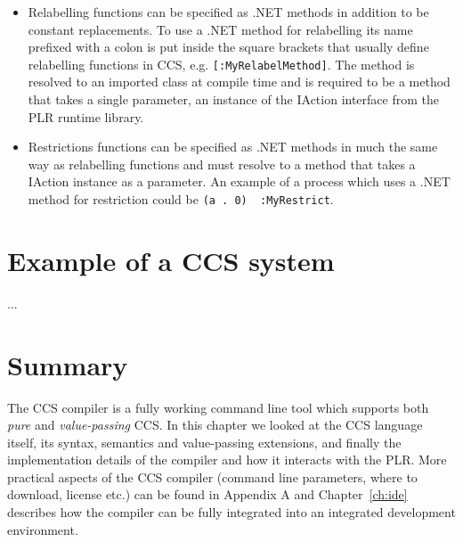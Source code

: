 \begin{itemize}
		\item Relabelling functions can be specified as .NET methods in addition 
		to be constant replacements. To use a .NET method for relabelling its name 
		prefixed with a colon is put inside the square brackets that usually 
		define relabelling functions in CCS, e.g. \texttt{[:MyRelabelMethod]}. The 
		method is resolved to an imported class at compile time and is required to 
		be a method that takes a single parameter, an instance of the 
		\textsf{IAction} interface from the PLR runtime library.
		
		\item Restrictions functions can be specified as .NET methods in much the 
		same way as relabelling functions and must resolve to a method that takes 
		a \textsf{IAction} instance as a parameter. An example of a process which 
		uses a .NET method for restriction could be \texttt{(a . 0) \ :MyRestrict}.

	\end{itemize}

\section{Example of a CCS system}
  ...	
	
\section{Summary}
	
	The CCS compiler is a fully working command line tool which supports both 
	\textit{pure} and \textit{value-passing} CCS. In this chapter we looked at 
	the CCS language itself, its syntax, semantics and value-passing extensions, 
	and finally the implementation details of the compiler and how it interacts 
	with the PLR.	More practical aspects of the CCS compiler (command line 
	parameters, where to download, license etc.) can be found in Appendix A and 
	Chapter~\ref{ch:ide} describes how the compiler can be fully integrated into 
	an integrated development environment.